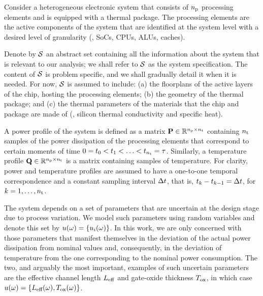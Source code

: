 Consider a heterogeneous electronic system that consists of ${n_\text{p}}$ processing elements and is equipped with a thermal package.
The processing elements are the active components of the system that are identified at the system level with a desired level of granularity (\eg, SoCs, CPUs, ALUs, caches).

Denote by $\mathcal{S}$ an abstract set containing all the information about the system that is relevant to our analysis; we shall refer to $\mathcal{S}$ as the system specification.
The content of $\mathcal{S}$ is problem specific, and we shall gradually detail it when it is needed.
For now, $\mathcal{S}$ is assumed to include: (a) the floorplans of the active layers of the chip, hosting the processing elements; (b) the geometry of the thermal package; and (c) the thermal parameters of the materials that the chip and package are made of (\eg, silicon thermal conductivity and specific heat).

A power profile of the system is defined as a matrix $\mathbf{P} \in \mathbb{R}^{{n_\text{p}} \times {n_\text{t}}}$ containing ${n_\text{t}}$ samples of the power dissipation of the processing elements that correspond to certain moments of time $0 = t_0 < t_1 < \dotsc < t_{n_\text{t}} = \tau$.
Similarly, a temperature profile $\mathbf{Q} \in \mathbb{R}^{{n_\text{p}} \times {n_\text{t}}}$ is a matrix containing samples of temperature.
For clarity, power and temperature profiles are assumed to have a one-to-one temporal correspondence and a constant sampling interval $\Delta t$, that is, $t_k - t_{k - 1} = \Delta t$, for $k = 1, \dots, {n_\text{t}}$.

The system depends on a set of parameters that are uncertain at the design stage due to process variation.
We model such parameters using random variables and denote this set by $u(\omega) = \{ u_i(\omega) \}$.
In this work, we are only concerned with those parameters that manifest themselves in the deviation of the actual power dissipation from nominal values and, consequently, in the deviation of temperature from the one corresponding to the nominal power consumption.
The two, and arguably the most important, examples of such uncertain parameters are the effective channel length $L_\text{eff}$ and gate-oxide thickness $T_\text{ox}$, in which case $u(\omega) = \{ L_\text{eff}(\omega), T_\text{ox}(\omega) \}$.
